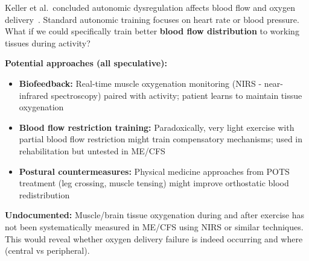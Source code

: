 \begin{open_question}
Keller et al.\ concluded autonomic dysregulation affects blood flow and oxygen delivery~\cite{keller2024cpet}. Standard autonomic training focuses on heart rate or blood pressure. What if we could specifically train better \textbf{blood flow distribution} to working tissues during activity?

\textbf{Potential approaches (all speculative):}
\begin{itemize}
    \item \textbf{Biofeedback:} Real-time muscle oxygenation monitoring (NIRS - near-infrared spectroscopy) paired with activity; patient learns to maintain tissue oxygenation
    \item \textbf{Blood flow restriction training:} Paradoxically, very light exercise with partial blood flow restriction might train compensatory mechanisms; used in rehabilitation but untested in ME/CFS
    \item \textbf{Postural countermeasures:} Physical medicine approaches from POTS treatment (leg crossing, muscle tensing) might improve orthostatic blood redistribution
\end{itemize}

\textbf{Undocumented:} Muscle/brain tissue oxygenation during and after exercise has not been systematically measured in ME/CFS using NIRS or similar techniques. This would reveal whether oxygen delivery failure is indeed occurring and where (central vs peripheral).
\end{open_question}

